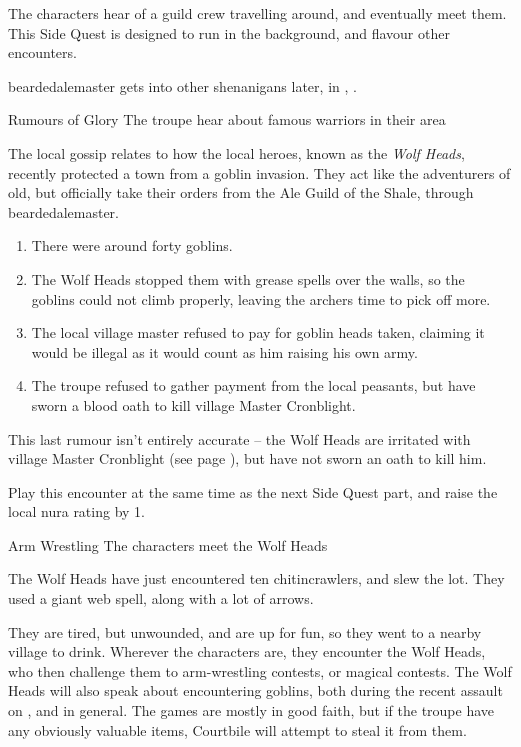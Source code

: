 \label{wolfHeads}

\noindent
The characters hear of a guild crew travelling around, and eventually meet them.
This Side Quest is designed to run in the background, and flavour other encounters.

\Gls{beardedalemaster} gets into other shenanigans later, in , .

{\N \squash Rumours of Glory}%
{The troupe hear about famous warriors in their area}%

The local gossip relates to how the local heroes, known as the \textit{Wolf Heads}, recently protected a town from a goblin invasion.
They act like the adventurers of old, but officially take their orders from the Ale Guild of the Shale, through \gls{beardedalemaster}.

\begin{enumerate}
  \item{There were around forty goblins.}
  \item{The Wolf Heads stopped them with grease spells over the walls, so the goblins could not climb properly, leaving the archers time to pick off more.}
  \item{The local village master refused to pay for goblin heads taken, claiming it would be illegal as it would count as him raising his own army.}
  \item{The troupe refused to gather payment from the local peasants, but have sworn a blood oath to kill \Gls{village} Master Cronblight.}
\end{enumerate}

This last rumour isn't entirely accurate -- the Wolf Heads are irritated with \Gls{village} Master Cronblight (see page \pageref{cronblight}), but have not sworn an oath to kill him.

Play this encounter at the same time as the next Side Quest part, and raise the local nura rating by 1.

{Arm Wrestling}%
{The characters meet the Wolf Heads}%

The Wolf Heads have just encountered ten chitincrawlers, and slew the lot.
They used a giant web spell, along with a lot of arrows.

They are tired, but unwounded, and are up for fun, so they went to a nearby village to drink.
Wherever the characters are, they encounter the Wolf Heads, who then challenge them to arm-wrestling contests, or magical contests.
The Wolf Heads will also speak about encountering goblins, both during the recent assault on , and in general.
The games are mostly in good faith, but if the troupe have any obviously valuable items, Courtbile will attempt to steal it from them.

